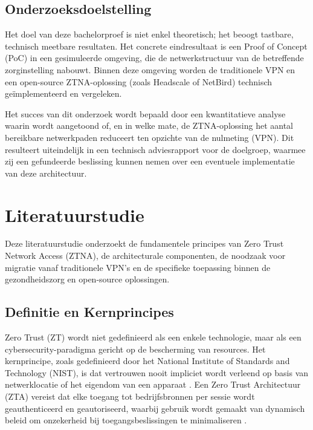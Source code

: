 \subsection{Onderzoeksdoelstelling}
Het doel van deze bachelorproef is niet enkel theoretisch; het beoogt tastbare, technisch meetbare resultaten. Het concrete eindresultaat is een Proof of Concept (PoC) in een gesimuleerde omgeving, die de netwerkstructuur van de betreffende zorginstelling nabouwt. Binnen deze omgeving worden de traditionele VPN en een open-source ZTNA-oplossing (zoals Headscale of NetBird) technisch geïmplementeerd en vergeleken.

Het succes van dit onderzoek wordt bepaald door een kwantitatieve analyse waarin wordt aangetoond of, en in welke mate, de ZTNA-oplossing het aantal bereikbare netwerkpaden reduceert ten opzichte van de nulmeting (VPN). Dit resulteert uiteindelijk in een technisch adviesrapport voor de doelgroep, waarmee zij een gefundeerde beslissing kunnen nemen over een eventuele implementatie van deze architectuur.

\section{Literatuurstudie}%
\label{sec:literatuurstudie}

Deze literatuurstudie onderzoekt de fundamentele principes van Zero Trust Network Access (ZTNA), de architecturale componenten, de noodzaak voor migratie vanaf traditionele VPN’s en de specifieke toepassing binnen de gezondheidszorg en open-source oplossingen.

\subsection{Definitie en Kernprincipes}
Zero Trust (ZT) wordt niet gedefinieerd als een enkele technologie, maar als een cybersecurity-paradigma gericht op de bescherming van resources. Het kernprincipe, zoals gedefinieerd door het National Institute of Standards and Technology (NIST), is dat vertrouwen nooit impliciet wordt verleend op basis van netwerklocatie of het eigendom van een apparaat \parencite{rose2020zero}. Een Zero Trust Architectuur (ZTA) vereist dat elke toegang tot bedrijfsbronnen per sessie wordt geauthenticeerd en geautoriseerd, waarbij gebruik wordt gemaakt van dynamisch beleid om onzekerheid bij toegangsbeslissingen te minimaliseren \parencite{rose2020zero}.

